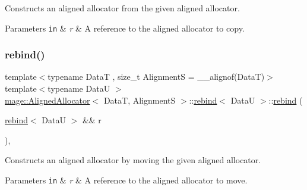 Constructs an aligned allocator from the given aligned allocator.


\begin{DoxyParams}[1]{Parameters}
\mbox{\tt in}  & {\em r} & A reference to the aligned allocator to copy. \\
\hline
\end{DoxyParams}
\hypertarget{structmage_1_1_aligned_allocator_1_1rebind_a863c98bf6c924e65e9d972ce93fccefc}{}\label{structmage_1_1_aligned_allocator_1_1rebind_a863c98bf6c924e65e9d972ce93fccefc} 
\subsubsection{\texorpdfstring{rebind()}{rebind()}\hspace{0.1cm}{\footnotesize\ttfamily [3/3]}}
{\footnotesize\ttfamily template$<$typename DataT , size\+\_\+t AlignmentS = \+\_\+\+\_\+alignof(\+Data\+T)$>$ \\
template$<$typename DataU $>$ \\
\hyperlink{structmage_1_1_aligned_allocator}{mage\+::\+Aligned\+Allocator}$<$ DataT, AlignmentS $>$\+::\hyperlink{structmage_1_1_aligned_allocator_1_1rebind}{rebind}$<$ DataU $>$\+::\hyperlink{structmage_1_1_aligned_allocator_1_1rebind}{rebind} (\begin{DoxyParamCaption}\item[{\hyperlink{structmage_1_1_aligned_allocator_1_1rebind}{rebind}$<$ DataU $>$ \&\&}]{r }\end{DoxyParamCaption})\hspace{0.3cm}{\ttfamily [private]}, {\ttfamily [delete]}}

Constructs an aligned allocator by moving the given aligned allocator.


\begin{DoxyParams}[1]{Parameters}
\mbox{\tt in}  & {\em r} & A reference to the aligned allocator to move. \\
\hline
\end{DoxyParams}
\hypertarget{structmage_1_1_aligned_allocator_1_1rebind_a6d49df31fc4f0a5122267be6ab8888a7}{}\label{structmage_1_1_aligned_allocator_1_1rebind_a6d49df31fc4f0a5122267be6ab8888a7} 
